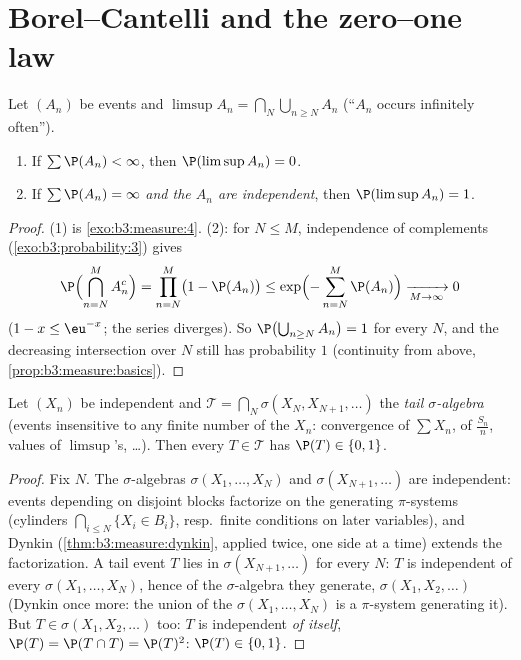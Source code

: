 \section{Borel--Cantelli and the zero--one law}

\begin{theorem}
\label{thm:b3:probability:borelcantelli}
Let $(A_n)$ be events and $\limsup A_n = \bigcap_N
\bigcup_{n\geq N}A_n$ (``$A_n$ occurs infinitely
often'').
\begin{enumerate}
  \item If $\sum\P(A_n) < \infty$, then $\P(\limsup A_n) =
        0$.
  \item If $\sum\P(A_n) = \infty$ \emph{and the $A_n$ are
        independent}, then $\P(\limsup A_n) = 1$.
\end{enumerate}
\end{theorem}

\begin{proof}
(1) is \cref{exo:b3:measure:4}. (2): for $N \leq M$,
independence of complements (\cref{exo:b3:probability:3})
gives
\[
\P\Bigl(\bigcap_{n=N}^{M}A_n^c\Bigr) = \prod_{n=N}^M\bigl(1
- \P(A_n)\bigr) \leq
\exp\Bigl(-\sum_{n=N}^M\P(A_n)\Bigr) \xrightarrow[M \to
\infty]{} 0
\]
($1 - x \leq \eu^{-x}$; the series diverges). So
$\P\bigl(\bigcup_{n\geq N}A_n\bigr) = 1$ for every $N$, and
the decreasing intersection over $N$ still has probability
$1$ (continuity from above, \cref{prop:b3:measure:basics}).
\end{proof}

\begin{theorem}
\label{thm:b3:probability:zeroone}
Let $(X_n)$ be independent and $\mathcal T =
\bigcap_N\sigma(X_N, X_{N+1}, \dots)$ the \emph{tail
$\sigma$-algebra} (events
insensitive to any finite number of the $X_n$: convergence of
$\sum X_n$, of $\frac{S_n}n$, values of $\limsup$'s, \dots).
Then every $T \in \mathcal T$ has $\P(T) \in \{0,
1\}$.
\end{theorem}

\begin{proof}
Fix $N$. The $\sigma$-algebras $\sigma(X_1, \dots, X_N)$ and
$\sigma(X_{N+1}, \dots)$ are independent: events depending on
disjoint blocks factorize on the generating $\pi$-systems
(cylinders $\bigcap_{i\leq N}\{X_i \in B_i\}$, resp.\ finite
conditions on later variables), and Dynkin
(\cref{thm:b3:measure:dynkin}, applied twice, one side at a
time) extends the factorization. A tail event $T$ lies in
$\sigma(X_{N+1}, \dots)$ for every $N$: $T$ is independent of
every $\sigma(X_1, \dots, X_N)$, hence of the $\sigma$-algebra
they generate, $\sigma(X_1, X_2, \dots)$ (Dynkin once more:
the union of the $\sigma(X_1,\dots,X_N)$ is a $\pi$-system
generating it). But $T \in \sigma(X_1, X_2, \dots)$ too: $T$
is independent \emph{of itself}, $\P(T) = \P(T\cap T) =
\P(T)^2$: $\P(T) \in \{0, 1\}$.
\end{proof}

